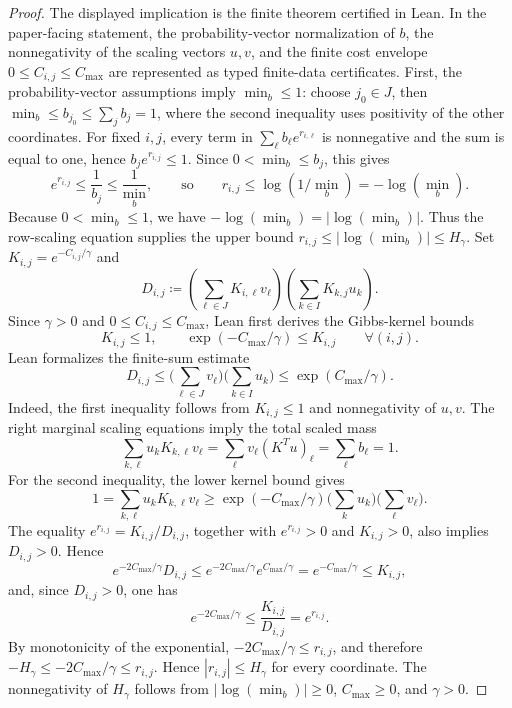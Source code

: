 \documentclass{article}
\theoremstyle{plain}
\begin{document}
\begin{proof}
The displayed implication is the finite theorem certified in Lean.  In the
paper-facing statement, the probability-vector normalization of \(b\), the
nonnegativity of the scaling vectors \(u,v\), and the finite cost envelope
\(0\le C_{i,j}\le C_{\max}\) are represented as typed finite-data certificates.
First, the
probability-vector assumptions imply $\min_b\le1$: choose $j_0\in J$, then
$\min_b\le b_{j_0}\le\sum_j b_j=1$, where the second inequality uses positivity
of the other coordinates.  For fixed \(i,j\), every term in
\(\sum_\ell b_\ell e^{r_{i,\ell}}\) is nonnegative and the sum is equal to
one, hence \(b_j e^{r_{i,j}}\le1\).  Since \(0<\min_b\le b_j\), this gives
\[
  e^{r_{i,j}}\le \frac1{b_j}\le \frac1{\min_b},
  \qquad\text{so}\qquad
  r_{i,j}\le \log(1/\min_b)=-\log(\min_b).
\]
Because \(0<\min_b\le1\), we have \(-\log(\min_b)=|\log(\min_b)|\).  Thus the
row-scaling equation supplies the upper bound \(r_{i,j}\le|\log(\min_b)|\le
H_\gamma\).  Set \(K_{i,j}=e^{-C_{i,j}/\gamma}\) and
\[
  D_{i,j}\coloneqq
  \left(\sum_{\ell\in J}K_{i,\ell}v_\ell\right)
  \left(\sum_{k\in I}K_{k,j}u_k\right).
\]
Since \(\gamma>0\) and \(0\le C_{i,j}\le C_{\max}\), Lean first derives the
Gibbs-kernel bounds
\[
  K_{i,j}\le 1,\qquad
  \exp(-C_{\max}/\gamma)\le K_{i,j}
  \qquad\forall(i,j).
\]
Lean formalizes the finite-sum estimate
\[
  D_{i,j}\le
  \Big(\sum_{\ell\in J}v_\ell\Big)\Big(\sum_{k\in I}u_k\Big)
  \le \exp(C_{\max}/\gamma).
\]
Indeed, the first inequality follows from \(K_{i,j}\le1\) and nonnegativity of
\(u,v\).  The right marginal scaling equations imply the total scaled mass
\[
  \sum_{k,\ell}u_kK_{k,\ell}v_\ell
  =
  \sum_\ell v_\ell(K^Tu)_\ell
  =
  \sum_\ell b_\ell
  =
  1.
\]
For the second inequality, the lower kernel bound gives
\[
  1=\sum_{k,\ell}u_kK_{k,\ell}v_\ell
  \ge
  \exp(-C_{\max}/\gamma)
  \Big(\sum_k u_k\Big)\Big(\sum_\ell v_\ell\Big).
\]
The equality \(e^{r_{i,j}}=K_{i,j}/D_{i,j}\), together with
\(e^{r_{i,j}}>0\) and \(K_{i,j}>0\), also implies \(D_{i,j}>0\).  Hence
\[
  e^{-2C_{\max}/\gamma}D_{i,j}
  \le e^{-2C_{\max}/\gamma}e^{C_{\max}/\gamma}
  =e^{-C_{\max}/\gamma}
  \le K_{i,j},
\]
and, since \(D_{i,j}>0\), one has
\[
  e^{-2C_{\max}/\gamma}\le \frac{K_{i,j}}{D_{i,j}}=e^{r_{i,j}}.
\]
By monotonicity of the exponential, \(-2C_{\max}/\gamma\le r_{i,j}\), and
therefore \(-H_\gamma\le -2C_{\max}/\gamma\le r_{i,j}\).  Hence
\(|r_{i,j}|\le H_\gamma\) for every coordinate.  The nonnegativity of
\(H_\gamma\) follows from \(|\log(\min_b)|\ge0\), \(C_{\max}\ge0\), and
\(\gamma>0\).


\end{proof}
\end{document}
